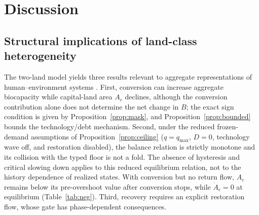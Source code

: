 \documentclass[preprint,12pt,authoryear]{elsarticle}
\begin{document}
\section{Discussion}\label{sec:discussion}

\subsection{Structural implications of land-class heterogeneity}

The two-land model yields three results relevant to aggregate representations of human--environment systems \citep{Schaefer1954,May1973,Meadows1972,Meadows2004,WackernagelRees1996,BranderTaylor1998}. First, conversion can increase aggregate biocapacity while capital-land area $A_c$ declines, although the conversion contribution alone does not determine the net change in $B$; the exact sign condition is given by Proposition~\ref{prop:mask}, and Proposition~\ref{prop:bounded} bounds the technology/debt mechanism. Second, under the reduced frozen-demand assumptions of Proposition~\ref{prop:ceiling} ($q=q_{\max}$, $D=0$, technology wave off, and restoration disabled), the balance relation is strictly monotone and its collision with the typed floor is not a fold. The absence of hysteresis and critical slowing down applies to this reduced equilibrium relation, not to the history dependence of realized states. With conversion but no return flow, $A_c$ remains below its pre-overshoot value after conversion stops, while $\dot A_c=0$ at equilibrium (Table~\ref{tab:neg}). Third, recovery requires an explicit restoration flow, whose gate has phase-dependent consequences.
\end{document}
